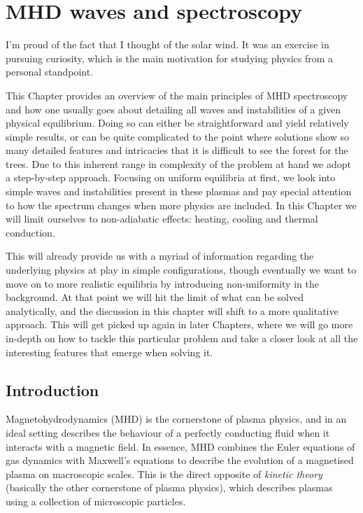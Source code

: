 \chapter{MHD waves and spectroscopy} \label{ch: spectroscopy}

\graphicspath{{02-MHD_spectroscopy/figures/}}

\begin{chapterquote}
  I'm proud of the fact that I thought of the solar wind. It was an exercise in pursuing curiosity, which is the main motivation for studying physics from a personal standpoint.
\end{chapterquote}

This Chapter provides an overview of the main principles of MHD spectroscopy and how one usually goes about detailing all waves and instabilities of a given physical equilibrium. Doing so can either be straightforward and yield relatively simple results, or can be quite complicated to the point where solutions show so many detailed features and intricacies that it is difficult to see the forest for the trees. Due to this inherent range in complexity of the problem at hand we adopt a step-by-step approach. Focusing on uniform equilibria at first, we look into simple waves and instabilities present in these plasmas and pay special attention to how the spectrum changes when more physics are included. In this Chapter we will limit ourselves to non-adiabatic effects: heating, cooling and thermal conduction.

This will already provide us with a myriad of information regarding the underlying physics at play in simple configurations, though eventually we want to move on to more realistic equilibria by introducing non-uniformity in the background. At that point we will hit the limit of what can be solved analytically, and the discussion in this chapter will shift to a more qualitative approach. This will get picked up again in later Chapters, where we will go more in-depth on how to tackle this particular problem and take a closer look at all the interesting features that emerge when solving it.

\section{Introduction}
Magnetohydrodynamics (MHD) is the cornerstone of plasma physics, and in an ideal setting describes the behaviour of a perfectly conducting fluid when it interacts with a magnetic field. In essence, MHD combines the Euler equations of gas dynamics with Maxwell's equations to describe the evolution of a magnetised plasma on macroscopic scales. This is the direct opposite of \emph{kinetic theory} (basically the other cornerstone of plasma physics), which describes plasmas using a collection of microscopic particles.

